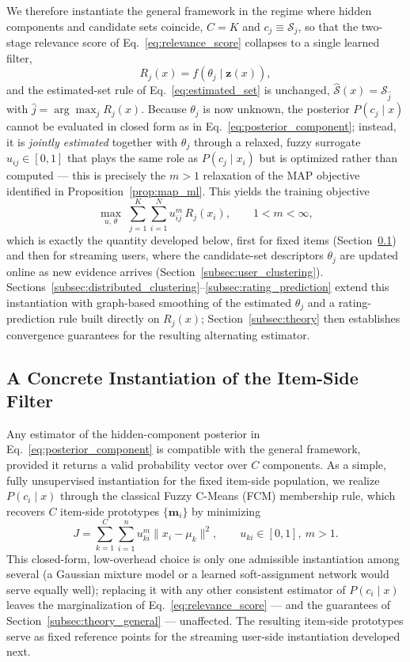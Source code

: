 \documentclass{article}
\theoremstyle{plain}
\theoremstyle{definition}
\theoremstyle{remark}
\begin{document}
We therefore instantiate the general framework in the regime where hidden components and candidate sets coincide, $C = K$ and $c_j \equiv \mathcal{S}_j$, so that the two-stage relevance score of Eq.~\eqref{eq:relevance_score} collapses to a single learned filter,
\begin{equation}
	\label{eq:collapsed_relevance}
	R_j(x) = f(\theta_j \mid \mathbf{z}(x)),
\end{equation}
and the estimated-set rule of Eq.~\eqref{eq:estimated_set} is unchanged, $\widehat{\mathcal{S}}(x) = \mathcal{S}_{\widehat{j}}$ with $\widehat{j} = \arg\max_j R_j(x)$. Because $\theta_j$ is now unknown, the posterior $P(c_j \mid x)$ cannot be evaluated in closed form as in Eq.~\eqref{eq:posterior_component}; instead, it is \emph{jointly estimated} together with $\theta_j$ through a relaxed, fuzzy surrogate $u_{ij} \in [0,1]$ that plays the same role as $P(c_j\mid x_i)$ but is optimized rather than computed — this is precisely the $m>1$ relaxation of the MAP objective identified in Proposition~\ref{prop:map_ml}. This yields the training objective
\[
\max_{u,\,\theta} \; \sum_{j=1}^{K} \sum_{i=1}^{N} u_{ij}^{m} \, R_j(x_i), \qquad 1 < m < \infty,
\]
which is exactly the quantity developed below, first for fixed items (Section~\ref{subsec:item_clustering}) and then for streaming users, where the candidate-set descriptors $\theta_j$ are updated online as new evidence arrives (Section~\ref{subsec:user_clustering}). Sections~\ref{subsec:distributed_clustering}--\ref{subsec:rating_prediction} extend this instantiation with graph-based smoothing of the estimated $\theta_j$ and a rating-prediction rule built directly on $R_j(x)$; Section~\ref{subsec:theory} then establishes convergence guarantees for the resulting alternating estimator.

\subsection{A Concrete Instantiation of the Item-Side Filter}
\label{subsec:item_clustering}

Any estimator of the hidden-component posterior in Eq.~\eqref{eq:posterior_component} is compatible with the general framework, provided it returns a valid probability vector over $C$ components. As a simple, fully unsupervised instantiation for the fixed item-side population, we realize $P(c_i \mid x)$ through the classical Fuzzy C-Means (FCM) membership rule, which recovers $C$ item-side prototypes $\{\mathbf{m}_i\}$ by minimizing
\begin{equation}
	J = \sum_{k=1}^{C} \sum_{i=1}^{n} u_{ki}^m \| x_i - \mu_k \|^2, \qquad u_{ki} \in [0,1],\ m>1.
\end{equation}
This closed-form, low-overhead choice is only one admissible instantiation among several (a Gaussian mixture model or a learned soft-assignment network would serve equally well); replacing it with any other consistent estimator of $P(c_i \mid x)$ leaves the marginalization of Eq.~\eqref{eq:relevance_score} — and the guarantees of Section~\ref{subsec:theory_general} — unaffected. The resulting item-side prototypes serve as fixed reference points for the streaming user-side instantiation developed next.
\end{document}
